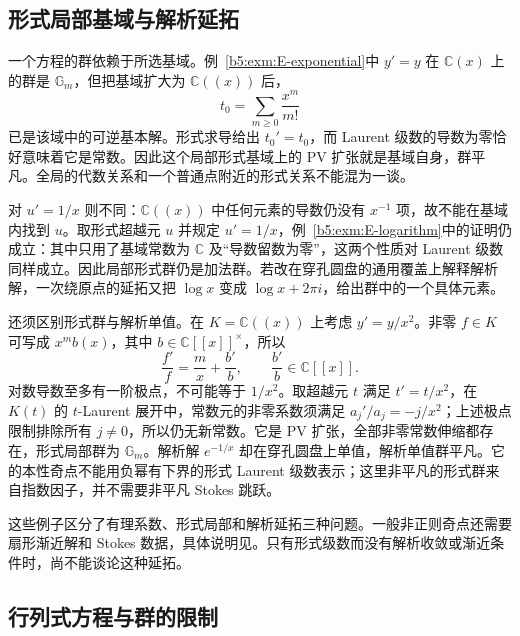 \subsection{形式局部基域与解析延拓}
\label{b5:subsec:E04:02}

一个方程的群依赖于所选基域。例~\ref{b5:exm:E-exponential}中 \(y'=y\) 在 \(\mathbb C(x)\) 上的群是 \(\mathbb G_m\)，但把基域扩大为 \(\mathbb C(\!(x)\!)\) 后，
\[
	t_0=\sum_{m\ge0}\frac{x^m}{m!}
\]
已是该域中的可逆基本解。形式求导给出 \(t_0'=t_0\)，而 Laurent 级数的导数为零恰好意味着它是常数。因此这个局部形式基域上的 PV 扩张就是基域自身，群平凡。全局的代数关系和一个普通点附近的形式关系不能混为一谈。

\ProseParagraphBreak
对 \(u'=1/x\) 则不同：\(\mathbb C(\!(x)\!)\) 中任何元素的导数仍没有 \(x^{-1}\) 项，故不能在基域内找到 \(u\)。取形式超越元 \(u\) 并规定 \(u'=1/x\)，例~\ref{b5:exm:E-logarithm}中的证明仍成立：其中只用了基域常数为 \(\mathbb C\) 及“导数留数为零”，这两个性质对 Laurent 级数同样成立。因此局部形式群仍是加法群。若改在穿孔圆盘的通用覆盖上解释解析解，一次绕原点的延拓又把 \(\log x\) 变成 \(\log x+2\pi i\)，给出群中的一个具体元素。

\ProseParagraphBreak
还须区别形式群与解析单值。在 \(K=\mathbb C(\!(x)\!)\) 上考虑 \(y'=y/x^2\)。非零 \(f\in K\) 可写成 \(x^m b(x)\)，其中 \(b\in\mathbb C[\![x]\!]^\times\)，所以
\[
	\frac{f'}f=\frac mx+\frac{b'}b, \qquad \frac{b'}b\in\mathbb C[\![x]\!].
\]
对数导数至多有一阶极点，不可能等于 \(1/x^2\)。取超越元 \(t\) 满足 \(t'=t/x^2\)，在 \(K(t)\) 的 \(t\)-Laurent 展开中，常数元的非零系数须满足 \(a_j'/a_j=-j/x^2\)；上述极点限制排除所有 \(j\ne0\)，所以仍无新常数。它是 PV 扩张，全部非零常数伸缩都存在，形式局部群为 \(\mathbb G_m\)。解析解 \(e^{-1/x}\) 却在穿孔圆盘上单值，解析单值群平凡。它的本性奇点不能用负幂有下界的形式 Laurent 级数表示；这里非平凡的形式群来自指数因子，并不需要非平凡 Stokes 跳跃。

\ProseParagraphBreak
这些例子区分了有理系数、形式局部和解析延拓三种问题。一般非正则奇点还需要扇形渐近解和 Stokes 数据，具体说明见。只有形式级数而没有解析收敛或渐近条件时，尚不能谈论这种延拓。

\subsection{行列式方程与群的限制}
\label{b5:subsec:E04:03}

